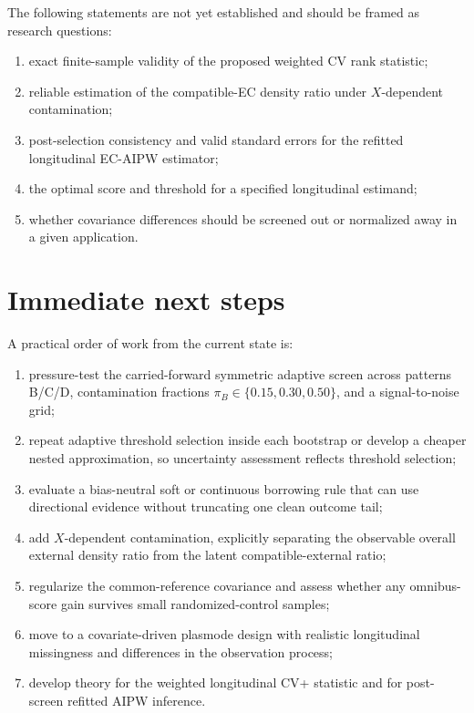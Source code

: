\documentclass[11pt]{article}
\begin{document}
The following statements are not yet established and should be framed as research questions:
\begin{enumerate}
    \item exact finite-sample validity of the proposed weighted CV rank statistic;
    \item reliable estimation of the compatible-EC density ratio under $X$-dependent contamination;
    \item post-selection consistency and valid standard errors for the refitted longitudinal EC-AIPW estimator;
    \item the optimal score and threshold for a specified longitudinal estimand;
    \item whether covariance differences should be screened out or normalized away in a given application.
\end{enumerate}

\section{Immediate next steps}

A practical order of work from the current state is:
\begin{enumerate}
    \item pressure-test the carried-forward symmetric adaptive screen across patterns B/C/D, contamination fractions $\pi_B\in\{0.15,0.30,0.50\}$, and a signal-to-noise grid;
    \item repeat adaptive threshold selection inside each bootstrap or develop a cheaper nested approximation, so uncertainty assessment reflects threshold selection;
    \item evaluate a bias-neutral soft or continuous borrowing rule that can use directional evidence without truncating one clean outcome tail;
    \item add $X$-dependent contamination, explicitly separating the observable overall external density ratio from the latent compatible-external ratio;
    \item regularize the common-reference covariance and assess whether any omnibus-score gain survives small randomized-control samples;
    \item move to a covariate-driven plasmode design with realistic longitudinal missingness and differences in the observation process;
    \item develop theory for the weighted longitudinal CV+ statistic and for post-screen refitted AIPW inference.
\end{enumerate}
\end{document}

